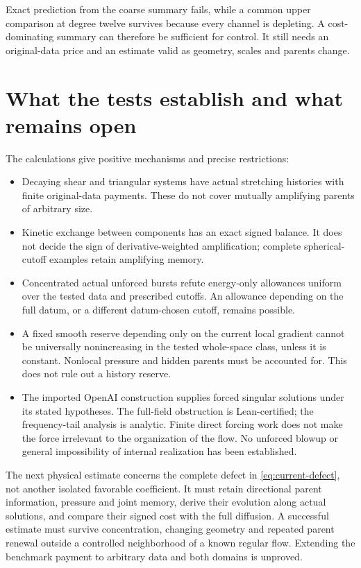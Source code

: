 \documentclass[11pt]{article}
\theoremstyle{definition}
\begin{document}
Exact prediction from the coarse summary fails, while a common upper
comparison at degree twelve survives because every channel is depleting.
A cost-dominating summary can therefore be sufficient for control. It still
needs an original-data price and an estimate valid as geometry, scales and
parents change.

\section{What the tests establish and what remains open}
\label{sec:current-obligations}

The calculations give positive mechanisms and precise restrictions:
\begin{itemize}
 \item Decaying shear and triangular systems have actual stretching histories
       with finite original-data payments. These do not cover mutually
       amplifying parents of arbitrary size.
 \item Kinetic exchange between components has an exact signed balance.
       It does not decide the sign of derivative-weighted amplification;
       complete spherical-cutoff examples retain amplifying memory.
 \item Concentrated actual unforced bursts refute energy-only allowances
       uniform over the tested data and prescribed cutoffs. An allowance
       depending on the full datum, or a different datum-chosen cutoff,
       remains possible.
 \item A fixed smooth reserve depending only on the current local gradient
       cannot be universally nonincreasing in the tested whole-space class,
       unless it is constant. Nonlocal pressure and hidden parents must be
       accounted for. This does not rule out a history reserve.
 \item The imported OpenAI construction supplies forced singular solutions
       under its stated hypotheses. The full-field obstruction is
       Lean-certified; the frequency-tail analysis is analytic. Finite direct
       forcing work does not make the force irrelevant to the organization of
       the flow. No unforced blowup or general impossibility of internal
       realization has been established.
\end{itemize}

The next physical estimate concerns the complete defect in
\eqref{eq:current-defect}, not another isolated favorable coefficient.
It must retain directional parent information, pressure and joint memory,
derive their evolution along actual solutions, and compare their signed cost
with the full diffusion. A successful estimate must survive concentration,
changing geometry and repeated parent renewal outside a controlled
neighborhood of a known regular flow. Extending the benchmark payment to
arbitrary data and both domains is unproved.
\end{document}
